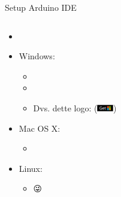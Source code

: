 \documentclass[aspectratio=169]{beamer}
\begin{document}
\begin{frame}{Setup Arduino IDE}
\begin{columns}
\begin{column}{0.5\textwidth}
\begin{textBox}
\begin{itemize}
\begin{itemize}
					\item {}
					\item Windows:
					\begin{itemize}
						\item  {} 
						\item {}
						\item Dvs.  dette logo: (\includegraphics[height=8pt, keepaspectratio=true]{assets/pictures/windows-get.png})
					\end{itemize}
					\item Mac OS X:
					\begin{itemize}
						\item {}
					\end{itemize}
					\item Linux:
					\begin{itemize}
						\item {}\color{arduinoBlue}😜%
					\end{itemize}
				\end{itemize}
			\end{itemize}
		\end{textBox}
	\end{column}
\end{columns}
\end{frame}
\end{document}
